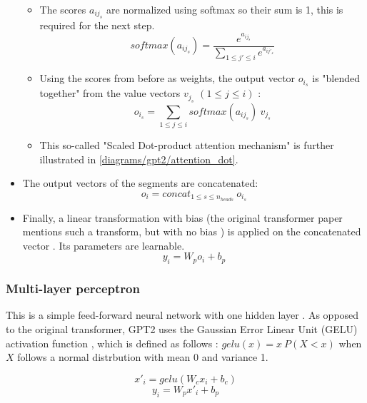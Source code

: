 \begin{itemize}
\begin{samepage}
\begin{itemize}
\item The scores $a_{ij_s}$ are normalized using softmax so their sum is 1, this is required for the next step.
   $$ softmax(a_{ij_s}) = \frac {e^{a_{ij_s}}} {\sum_{1 \leq j' \leq i} {e^{a_{ij'_s}}}} $$


\item Using the scores from before as weights, the output vector $o_{i_s}$ is "blended together" from the value vectors $v_{j_s}$ $(1 \leq j \leq i)$ \cite{alammar-gpt2}:
    $$o_{i_s} = \sum _{1 \leq j \leq i} softmax(a_{ij_s}) \ v_{j_s}$$

\item This so-called "Scaled Dot-product attention mechanism" is further illustrated in \cref{diagrams/gpt2/attention_dot}.

\end{itemize}
\end{samepage}


\item The output vectors of the segments are concatenated:
   $$o_i = concat _{1 \leq s \leq n_{heads}} \ o_{i_s}$$



\item Finally, a linear transformation with bias (the original transformer paper mentions such a transform, but with no bias ) is applied on the concatenated vector \cite{alammar-gpt2}. Its parameters are learnable.
   $$y_i = W_p o_i + b_p$$

\end{itemize}

\subsubsection{Multi-layer perceptron}


This is a simple feed-forward neural network with one hidden layer .
As opposed to the original transformer, GPT2 uses the Gaussian Error Linear Unit (GELU) activation function , which is defined as follows \cite{gelu}: $gelu(x) = x \ P(X<x)$ when $X$ follows a normal distrbution with mean 0 and variance 1.

$$x'_i = gelu(W_c x_i + b_c)$$
$$y_i = W_p x'_i + b_p$$

